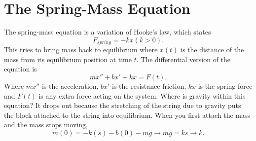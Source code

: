 \section{The Spring-Mass Equation}

  The spring-mass equation is a variation of Hooke's law, which states
  \[
    F_{spring}=-kx(k>0)
  .\] 
  This tries to bring mass back to equilibrium where $x(t)$ is the distance of the mass from its equilibrium position at time $t$. The differential version of the equation is
  \[
    mx''+bx'+kx=F(t)
  .\] 
  Where $mx''$ is the acceleration, $bx'$ is the resistance friction, $kx$ is the spring force and $F(t)$ is any extra force acting on the system. Where is gravity within this equation? It drops out because the stretching of the string due to gravity puts the block attached to the string into equilibrium.\newline\newline
  When you first attach the mass and the mass stops moving,
  \[
    m(0)=-k(s)-b(0)-mg\to mg=ks\to k
  .\] 
